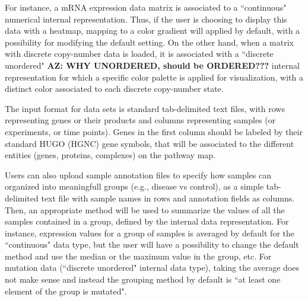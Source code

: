 \documentclass[a4,center,fleqn]{NAR}
\begin{document}
For instance, a mRNA expression data matrix is associated to a
``continuous" numerical internal representation. Thus, if the user is choosing to display
this data with a heatmap, mapping to a color gradient will applied by default, with a possibility
for modifying the default setting. On the other hand, when a
matrix with discrete copy-number data is loaded, it is associated with a
``discrete unordered" {\bf AZ: WHY UNORDERED, should be ORDERED???} internal representation for which
a specific color palette is applied for visualization,
with a distinct color associated to each discrete copy-number state.

The input format for data sets is standard tab-delimited text files, with rows
representing genes or their products and columns representing samples (or experiments, or time
points). Genes in the first column should be labeled by their standard HUGO (HGNC)
gene symbols, that will be associated to the different entities (genes,
proteins, complexes) on the pathway map.

Users can also upload sample annotation files to specify how samples can organized into meaningfull groups
(e.g., disease vs control), as a simple tab-delimited text file with sample names in
rows and annotation fields as columns. Then, an appropriate method will be used
to summarize the values of all the samples contained in a group, defined by the
internal data representation. For instance, expression values for a group of samples
is averaged by default for the ``continuous" data type, but the user will have
a possibility to change the default method and use the median or
the maximum value in the group, etc. For mutation data (``discrete unordered" internal data type),
taking the average does not make sense and instead the grouping method by default is
``at least one element of the group is mutated".

\begin{table}
{
}
\end{table}
\end{document}
